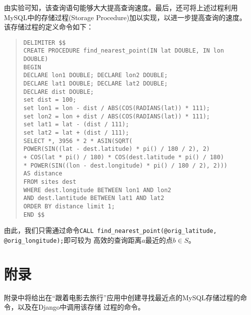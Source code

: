 由实验可知，该查询语句能够大大提高查询速度。最后，还可将上述过程利用MySQL中的存储过程(Storage
Procedure)加以实现，以进一步提高查询的速度。该存储过程的定义命令如下：

\begin{quote}
  \texttt{DELIMITER \$\$\\
    CREATE PROCEDURE find\_nearest\_point(IN lat DOUBLE, IN lon DOUBLE)\\
    BEGIN\\
    DECLARE lon1 DOUBLE; DECLARE lon2 DOUBLE;\\
    DECLARE lat1 DOUBLE; DECLARE lat2 DOUBLE;\\
    DECLARE dist DOUBLE;\\
    set dist = 100;\\
    set lon1 = lon - dist / ABS(COS(RADIANS(lat)) * 111);\\
    set lon2 = lon + dist / ABS(COS(RADIANS(lat)) * 111);\\
    set lat1 = lat - (dist / 111);\\
    set lat2 = lat + (dist / 111);\\
    SELECT *, 3956 * 2 * ASIN(SQRT(\\
    POWER(SIN((lat - dest.latitude) * pi() / 180 / 2), 2)\\
    + COS(lat * pi() / 180) * COS(dest.latitude * pi() / 180)\\
    * POWER(SIN((lon - dest.longitude) * pi() / 180 / 2), 2)))\\
    AS distance\\
    FROM sites dest\\
    WHERE dest.longitude BETWEEN lon1 AND lon2\\
    AND dest.lantitude BETWEEN lat1 AND lat2\\
    ORDER BY distance limit 1;\\
    END \$\$} 
\end{quote}

由此，我们只需通过命令\texttt{CALL find\_nearest\_point(@orig\_latitude, @orig\_longitude);}即可较为
高效的查询距离$a$最近的点$b\in S$。

\section{附录}
附录中将给出在“跟着电影去旅行”应用中创建寻找最近点的MySQL存储过程的命令，以及在Django中调用该存储
过程的命令。

